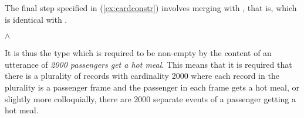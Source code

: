 The final step specified in (\ref{ex:cardconstr}) involves merging
 with , that is,  which is identical
with .
\begin{ex} 
\begin{subex} 
 
\item
 
\item
 \d{$\wedge$} 

\item 
\end{subex} 
   
\end{ex} 
It is thus the type  which is required to be non-empty by
the content of an utterance of \textit{2000 passengers get a hot
  meal}.  This means that it is required that there is a plurality of
records with cardinality 2000 where each record in the plurality is a
passenger frame and the passenger in each frame gets a hot meal, or
slightly more colloquially, there are 2000 separate events of a
passenger getting a hot meal.

  
